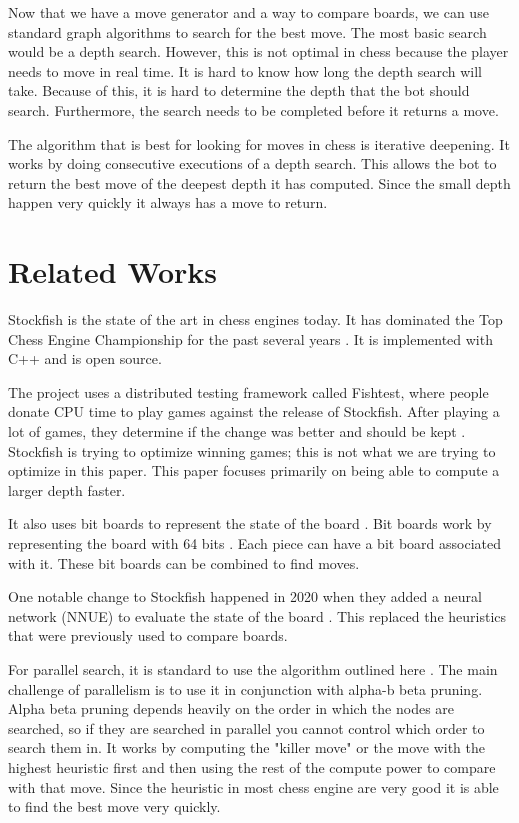 \documentclass[sigconf]{acmart}
\begin{document}
Now that we have a move generator and a way to compare boards, we can use standard graph algorithms to search for the best move.
The most basic search would be a depth search.
However, this is not optimal in chess because the player needs to move in real time.
It is hard to know how long the depth search will take.
Because of this, it is hard to determine the depth that the bot should search. 
Furthermore, the search needs to be completed before it returns a move.

The algorithm that is best for looking for moves in chess is iterative deepening.
It works by doing consecutive executions of a depth search.
This allows the bot to return the best move of the deepest depth it has computed.
Since the small depth happen very quickly it always has a move to return.

\section{Related Works}
Stockfish \cite{stockfish} is the state of the art in chess engines today.
It has dominated the Top Chess Engine Championship for the past several years \cite{stockwiki}.
It is implemented with C++ and is open source.

The project uses a distributed testing framework called Fishtest, where people donate CPU time to play games against the release of Stockfish.
After playing a lot of games, they determine if the change was better and should be kept \cite{stockwiki}.
Stockfish is trying to optimize winning games; this is not what we are trying to optimize in this paper.
This paper focuses primarily on being able to compute a larger depth faster.

It also uses bit boards to represent the state of the board \cite{stockwiki}.
Bit boards work by representing the board with 64 bits \cite{bitboard}.
Each piece can have a bit board associated with it.
These bit boards can be combined to find moves.

One notable change to Stockfish happened in 2020 when they added a neural network (NNUE) to evaluate the state of the board \cite{chesswiki}.
This replaced the heuristics that were previously used to compare boards.

For parallel search, it is standard to use the algorithm outlined here \cite{parallel}.
The main challenge of parallelism is to use it in conjunction with alpha-b beta pruning.
Alpha beta pruning depends heavily on the order in which the nodes are searched, so if they are searched in parallel you cannot control which order to search them in.
It works by computing the "killer move" or the move with the highest heuristic first and then using the rest of the compute power to compare with that move.
Since the heuristic in most chess engine are very good it is able to find the best move very quickly.
\end{document}
